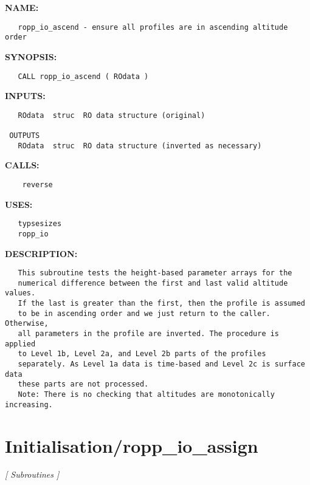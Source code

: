 \label{ch:robo66}
\label{ch:Initialisation_ropp_io_ascend}
\textbf{NAME:}\hspace{0.08in}\begin{Verbatim}
   ropp_io_ascend - ensure all profiles are in ascending altitude order
\end{Verbatim}
\textbf{SYNOPSIS:}\hspace{0.08in}\begin{Verbatim}
   CALL ropp_io_ascend ( ROdata )
\end{Verbatim}
\textbf{INPUTS:}\hspace{0.08in}\begin{Verbatim}
   ROdata  struc  RO data structure (original)

 OUTPUTS
   ROdata  struc  RO data structure (inverted as necessary)
\end{Verbatim}
\textbf{CALLS:}\hspace{0.08in}\begin{Verbatim}
    reverse
\end{Verbatim}
\textbf{USES:}\hspace{0.08in}\begin{Verbatim}
   typsesizes
   ropp_io
\end{Verbatim}
\textbf{DESCRIPTION:}\hspace{0.08in}\begin{Verbatim}
   This subroutine tests the height-based parameter arrays for the
   numerical difference between the first and last valid altitude values.
   If the last is greater than the first, then the profile is assumed
   to be in ascending order and we just return to the caller. Otherwise,
   all parameters in the profile are inverted. The procedure is applied
   to Level 1b, Level 2a, and Level 2b parts of the profiles 
   separately. As Level 1a data is time-based and Level 2c is surface data
   these parts are not processed.
   Note: There is no checking that altitudes are monotonically increasing.
\end{Verbatim}
\section{Initialisation/ropp\_io\_assign}
\textsl{[ Subroutines ]}


